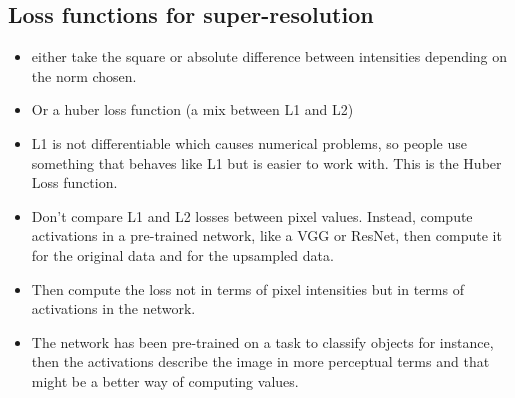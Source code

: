 \documentclass[11pt]{article}
\begin{document}
\subsection{Loss functions for super-resolution}

\begin{minipage}[l]{.5\linewidth}
    \begin{figure}[H]
        \centering
    \end{figure}    
\end{minipage}\hfill
\begin{minipage}[r]{.48\linewidth}
    \begin{itemize}
        \item either take the square or absolute difference between intensities depending on the norm chosen.
        \item Or a huber loss function (a mix between L1 and L2)
        \item L1 is not differentiable which causes numerical problems, so people use something that behaves like L1 but is easier to work with. This is the Huber Loss function.
    \end{itemize}
\end{minipage}

\begin{minipage}[l]{.5\linewidth}
    \begin{figure}[H]
        \centering
    \end{figure}    
\end{minipage}\hfill
\begin{minipage}[r]{.48\linewidth}
    \begin{itemize}
        \item Don't compare L1 and L2 losses between pixel values. Instead, compute activations in a pre-trained network, like a VGG or ResNet, then compute it for the original data and for the upsampled data.
        \item Then compute the loss not in terms of pixel intensities but in terms of activations in the network.
    \end{itemize}
\end{minipage}

\begin{itemize}
    \item The network has been pre-trained on a task to classify objects for instance, then the activations describe the image in more perceptual terms and that might be a better way of computing values. 
\end{itemize}
\end{document}
